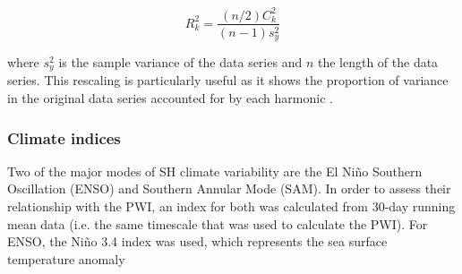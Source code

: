 \begin{equation}\label{eq:variance_explained}
R_k^2 = \frac{(n/2)C_k^2}{(n-1)s_y^2}
\end{equation}

where $s_y^2$ is the sample variance of the data series and $n$ the length of the data series. This rescaling is particularly useful as it shows the proportion of variance in the original data series accounted for by each harmonic \citep{Wilks2011}.

\subsubsection{Climate indices}
Two of the major modes of SH climate variability are the El Ni\~{n}o Southern Oscillation (ENSO) and Southern Annular Mode (SAM). In order to assess their relationship with the PWI, an index for both was calculated from 30-day running mean data (i.e. the same timescale that was used to calculate the PWI). For ENSO, the Ni\~{n}o 3.4 index \citet{Trenberth2001} was used, which represents the sea surface temperature anomaly 

